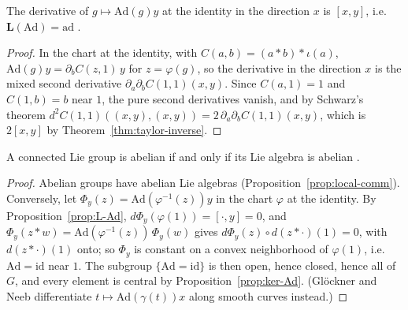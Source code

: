 \begin{proposition}
  \label{prop:L-Ad}
  \leanok
  The derivative of $g \mapsto \mathrm{Ad}(g)y$ at the identity in the direction $x$ is $[x, y]$,
  i.e.\ $\mathbf{L}(\mathrm{Ad}) = \mathrm{ad}$ \cite[Proposition 5.2.5]{GN26}.
\end{proposition}

\begin{proof}
  \leanok
  In the chart at the identity, with $C(a, b) = (a * b) * \iota(a)$,
  $\mathrm{Ad}(g)y = \partial_b C(z, 1)\,y$ for $z = \varphi(g)$, so the derivative in the direction $x$
  is the mixed second derivative $\partial_a \partial_b C(1, 1)(x, y)$. Since $C(a, 1) = 1$ and
  $C(1, b) = b$ near $1$, the pure second derivatives vanish, and by Schwarz's theorem
  $d^2 C(1, 1)((x, y), (x, y)) = 2\,\partial_a \partial_b C(1, 1)(x, y)$, which is $2[x, y]$ by
  Theorem~\ref{thm:taylor-inverse}.
\end{proof}

\begin{theorem}
  \label{thm:abelian}
  \leanok
  A connected Lie group is abelian if and only if its Lie algebra is abelian
  \cite[Proposition 5.5.9]{GN26}.
\end{theorem}

\begin{proof}
  \leanok
  Abelian groups have abelian Lie algebras (Proposition~\ref{prop:local-comm}). Conversely, let
  $\Phi_y(z) = \mathrm{Ad}(\varphi^{-1}(z))y$ in the chart $\varphi$ at the identity. By
  Proposition~\ref{prop:L-Ad}, $d\Phi_y(\varphi(1)) = [\cdot, y] = 0$, and
  $\Phi_y(z * w) = \mathrm{Ad}(\varphi^{-1}(z))\,\Phi_y(w)$ gives
  $d\Phi_y(z) \circ d(z * \cdot)(1) = 0$, with $d(z * \cdot)(1)$ onto; so $\Phi_y$ is constant on a
  convex neighborhood of $\varphi(1)$, i.e.\ $\mathrm{Ad} = \mathrm{id}$ near $1$. The subgroup
  $\{\mathrm{Ad} = \mathrm{id}\}$ is then open, hence closed, hence all of $G$, and every element is
  central by Proposition~\ref{prop:ker-Ad}. (Glöckner and Neeb differentiate
  $t \mapsto \mathrm{Ad}(\gamma(t))x$ along smooth curves instead.)
\end{proof}


